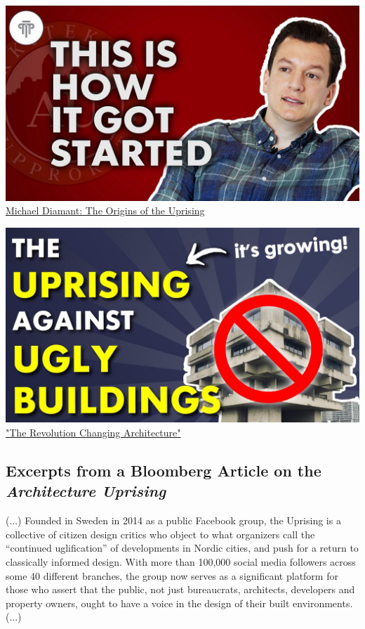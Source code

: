 \documentclass[a4paper]{article}
\begin{document}
\noindent
\begin{minipage}[t]{0.49\linewidth}
    \centering
    \includegraphics[width=\linewidth]{./figures/thumbnail_interview.jpg}
    \href{https://youtu.be/a9uLNxyKgCE?si=srT0AzgzI3LR4ccr}{Michael Diamant: The Origins of the Uprising}
\end{minipage}%
\hfill
\begin{minipage}[t]{0.49\linewidth}
    \centering
    \includegraphics[width=\linewidth]{./figures/thumbnail_uprising.jpg}
    \href{https://youtu.be/NTGQ_kITzmY?si=yEBpKZUstUKUUOqp}{"The Revolution Changing Architecture"}
\end{minipage}

\subsection{Excerpts from a Bloomberg Article \cite{gersten_nordic_2023} on the \textit{Architecture Uprising}}

(...) Founded in Sweden in 2014 as a public Facebook group, the Uprising is a collective of citizen design critics who object to what organizers call the “continued uglification” of developments in Nordic cities, and push for a return to classically informed design. With more than 100,000 social media followers across some 40 different branches, the group now serves as a significant platform for those who assert that the public, not just bureaucrats, architects, developers and property owners, ought to have a voice in the design of their built environments. (...)
\end{document}
